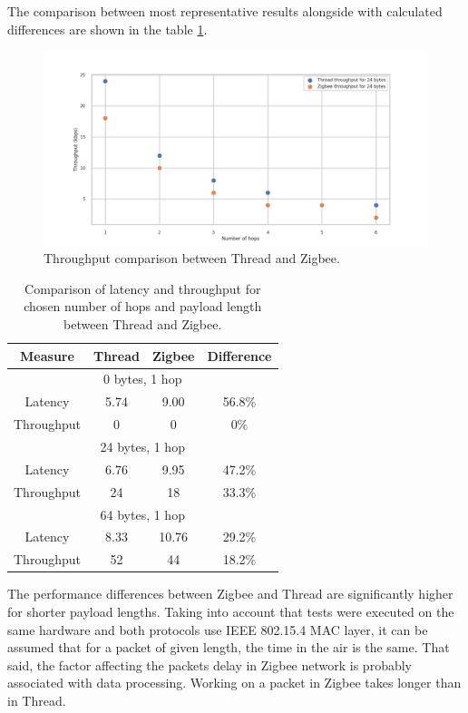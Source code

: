 The comparison
between most representative results alongside with calculated differences are shown in the table 
\ref{table:comparison}.

\begin{figure}[H]
    \centering
    \includegraphics[scale=0.45]{images/Thread_vs_Zigbee_Throoughput.png}
    \caption{Throughput comparison between Thread and Zigbee.}
    \label{fig:thread_vs_zigbee_throughput}
\end{figure}



\begin{table}[H]
\centering
\begin{tabular}{|c|c|c|c|}
\hline
Measure    & Thread & Zigbee & Difference        \\
\hline
\multicolumn{4}{c}{0 bytes, 1 hop}     \\
\hline
Latency    &   5.74     &   9.00     &    56.8\%               \\
Throughput &   0     &    0    &          0\%         \\
\hline
\multicolumn{4}{c}{24 bytes, 1 hop}    \\
\hline
Latency    &  6.76      &   9.95     &      47.2\%             \\
Throughput &   24     &    18    &       33.3\%            \\
\hline
\multicolumn{4}{c}{64 bytes, 1 hop}    \\
\hline
Latency    &   8.33     &   10.76     &      29.2\%          \\
Throughput &   52     &    44    &      18.2\%            \\
\hline
\end{tabular}
\caption{Comparison of latency and throughput for chosen number of hops and payload length between Thread and Zigbee.}
\label{table:comparison}
\end{table}

The performance differences between Zigbee and Thread are significantly
higher for shorter payload lengths. Taking into account that tests
were executed on the same hardware and both protocols use IEEE 802.15.4
MAC layer, it can be assumed that for a packet of given length, the 
time in the air is the same. That said, the factor affecting the
packets delay in Zigbee network is probably associated with data 
processing. Working on a packet in Zigbee takes longer than in
Thread.
